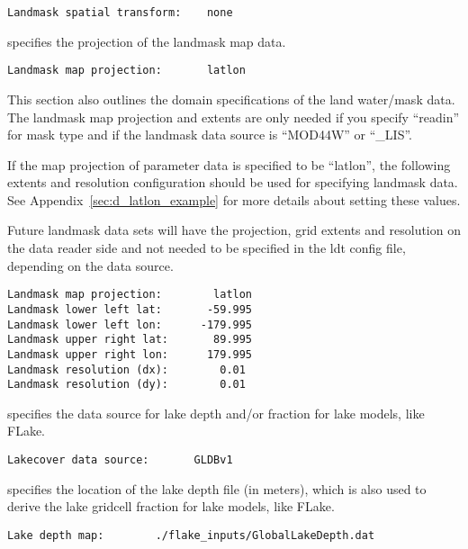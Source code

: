  \begin{Verbatim}[frame=single]
Landmask spatial transform:    none     
 \end{Verbatim}

 
  specifies the projection of the
 landmask map data.
 

 \begin{Verbatim}[frame=single]
Landmask map projection:       latlon
 \end{Verbatim}

 
 This section also outlines the domain specifications of the
 land water/mask data.  The landmask map projection and extents
 are only needed if you specify ``readin'' for mask type and
 if the landmask data source is ``MOD44W'' or ``\_LIS''.  
 
 If the map projection of parameter data is specified to be ``latlon'',
 the following extents and resolution configuration should be used 
 for specifying landmask data.
 See Appendix~\ref{sec:d_latlon_example} for more details about
 setting these values.

 Future landmask data sets will have the projection, grid extents and 
 resolution on the data reader side and not needed to be specified in
 the ldt config file, depending on the data source.
 

 \begin{Verbatim}[frame=single]
Landmask map projection:        latlon
Landmask lower left lat:       -59.995
Landmask lower left lon:      -179.995
Landmask upper right lat:       89.995
Landmask upper right lon:      179.995
Landmask resolution (dx):        0.01
Landmask resolution (dy):        0.01
 \end{Verbatim}

 

 
  specifies the data source for lake depth and/or
 fraction for lake models, like FLake.
 

 \begin{Verbatim}[frame=single]
Lakecover data source:       GLDBv1
 \end{Verbatim}

 
  specifies the location of the lake depth file
 (in meters), which is also used to derive the lake gridcell fraction
 for lake models, like FLake.
 

 \begin{Verbatim}[frame=single]
Lake depth map:        ./flake_inputs/GlobalLakeDepth.dat  
 \end{Verbatim}

